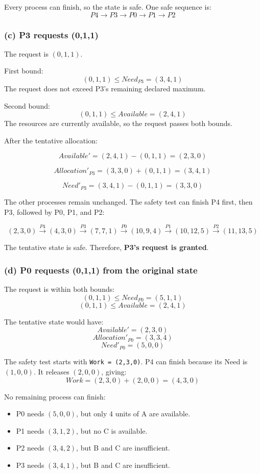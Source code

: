 \documentclass[conference]{IEEEtran}
\begin{document}
Every process can finish, so the state is safe. One safe sequence is:
\[
\boxed{P4 \rightarrow P3 \rightarrow P0 \rightarrow P1 \rightarrow P2}
\]

\subsubsection{(c) P3 requests (0,1,1)}
The request is \((0,1,1)\).

First bound:
\[
(0,1,1) \le Need_{P3}=(3,4,1)
\]
The request does not exceed P3's remaining declared maximum.

Second bound:
\[
(0,1,1) \le Available=(2,4,1)
\]
The resources are currently available, so the request passes both bounds.

After the tentative allocation:

\[
Available'=(2,4,1)-(0,1,1)=(2,3,0)
\]

\[
Allocation'_{P3}=(3,3,0)+(0,1,1)=(3,4,1)
\]

\[
Need'_{P3}=(3,4,1)-(0,1,1)=(3,3,0)
\]

The other processes remain unchanged. The safety test can finish P4 first, then P3, followed by P0, P1, and P2:

\[
(2,3,0)\xrightarrow{P4}(4,3,0)
\xrightarrow{P3}(7,7,1)
\xrightarrow{P0}(10,9,4)
\xrightarrow{P1}(10,12,5)
\xrightarrow{P2}(11,13,5)
\]

The tentative state is safe. Therefore, \textbf{P3's request is granted}.

\subsubsection{(d) P0 requests (0,1,1) from the original state}
The request is within both bounds:
\[
(0,1,1)\le Need_{P0}=(5,1,1)
\]
\[
(0,1,1)\le Available=(2,4,1)
\]

The tentative state would have:
\[
Available'=(2,3,0)
\]
\[
Allocation'_{P0}=(3,3,4)
\]
\[
Need'_{P0}=(5,0,0)
\]

The safety test starts with \texttt{Work = (2,3,0)}. P4 can finish because its Need is \((1,0,0)\). It releases \((2,0,0)\), giving:
\[
Work=(2,3,0)+(2,0,0)=(4,3,0)
\]

No remaining process can finish:
\begin{itemize}
    \item P0 needs \((5,0,0)\), but only 4 units of A are available.
    \item P1 needs \((3,1,2)\), but no C is available.
    \item P2 needs \((3,4,2)\), but B and C are insufficient.
    \item P3 needs \((3,4,1)\), but B and C are insufficient.
\end{itemize}
\end{document}
